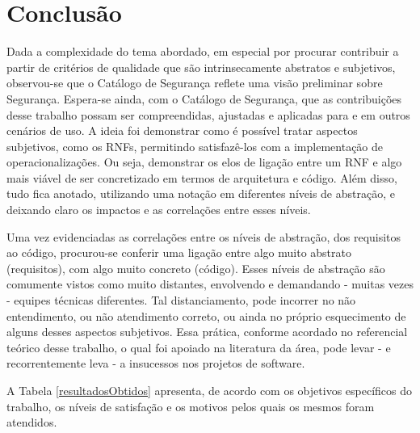 \chapter[Conclusão]{Conclusão}
\label{chap:consideracoesFinais}



Dada a complexidade do tema abordado, em especial por procurar contribuir a partir de critérios de qualidade que são intrinsecamente abstratos e subjetivos, observou-se que o Catálogo de Segurança reflete uma visão preliminar sobre Segurança. Espera-se ainda, com o Catálogo de Segurança, que as contribuições desse trabalho possam ser compreendidas, ajustadas e aplicadas para e em outros cenários de uso. A ideia foi demonstrar como é possível tratar aspectos subjetivos, como os RNFs, permitindo satisfazê-los com a implementação de operacionalizações. Ou seja, demonstrar os elos de ligação entre um RNF e algo mais viável de ser concretizado em termos de arquitetura e código. Além disso, tudo fica anotado, utilizando uma notação em diferentes níveis de abstração, e deixando claro os impactos e as correlações entre esses níveis.

Uma vez evidenciadas as correlações entre os níveis de abstração, dos requisitos ao código, procurou-se conferir uma ligação entre algo muito abstrato (requisitos), com algo muito concreto (código). Esses níveis de abstração são comumente vistos como muito distantes, envolvendo e demandando - muitas vezes - equipes técnicas diferentes. Tal distanciamento, pode incorrer no não entendimento, ou não atendimento correto, ou ainda no próprio esquecimento de alguns desses aspectos subjetivos. Essa prática, conforme acordado no referencial teórico desse trabalho, o qual foi apoiado na literatura da área, pode levar - e recorrentemente leva - a insucessos nos projetos de software. 


A Tabela \ref{resultadosObtidos} apresenta, de acordo com os objetivos específicos do trabalho, os níveis de satisfação e os motivos pelos quais os mesmos foram atendidos. 



